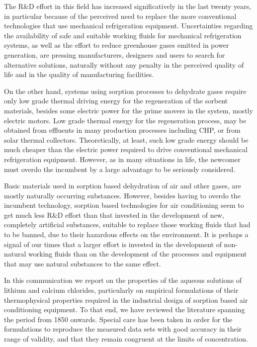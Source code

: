 \documentclass[11pt]{article}
\begin{document}
The R\&D effort in this field has increased significatively in the last twenty years, in
particular because of the perceived need to replace the more conventional technologies that
use mechanical refrigeration equipment. Uncertainties regarding the availability of safe
and suitable working fluids for mechanical refrigeration systems, as well as the effort to
reduce greenhouse gases emitted in power generation, are pressing manufacturers, designers
and users to search for alternative solutions, naturally without any penalty in the
perceived quality of life and in the quality of manufacturing facilities.

On the other hand, systems using sorption processes to dehydrate gases require only low
grade thermal driving energy for the regeneration of the sorbent materials, besides some
electric power for the prime movers in the system, mostly electric motors. Low grade
thermal energy for the regeneration process, may be obtained from effluents in many
production processes including CHP, or from solar thermal collectors. Theoretically, at
least, such low grade energy should be much cheaper than the electric power required to
drive conventional mechanical refrigeration equipment. However, as in many situations in
life, the newcomer must overdo the incumbent by a large advantage to be seriously
considered.

Basic materials used in sorption based dehydration of air and other gases, are mostly
naturally occurring substances. However, besides having to overdo the incumbent technology,
sorption based technologies for air conditioning seem to get much less R\&D effort than
that invested in the development of new, completely artificial substances, suitable to
replace those working fluids that had to be banned, due to their hazardous effects on the
environment. It is perhaps a signal of our times that a larger effort is invested in the
development of non-natural working fluids than on the development of the processes and
equipment that may use natural substances to the same effect.

In this communication we report on the properties of the aqueous solutions of lithium and
calcium chlorides, particularly on empirical formulations of their thermophysical
properties required in the industrial design of sorption based air conditioning equipment.
To that end, we have reviewed the literature spanning the period from 1850 onwards. Special
care has been taken in order for the formulations to reproduce the measured data sets with
good accuracy in their range of validity, and that they remain congruent at the limits of
concentration.
\end{document}
